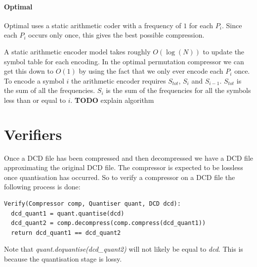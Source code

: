 \documentclass{report}
\newcommand{\todo}{\textbf{TODO} }
\begin{document}
\paragraph{Optimal}
Optimal uses a static arithmetic coder with a frequency of $1$ for each
$P_i$. Since each $P_i$ occurs only once, this gives the best possible
compression.

A static arithmetic encoder model takes roughly $O(\log(N))$ to update the
symbol table for each encoding. In the optimal permutation compressor we can
get this down to $O(1)$ by using the fact that we only ever encode each $P_i$
once. To encode a symbol $i$ the arithmetic encoder requires $S_{tot}$, $S_i$
and $S_{i-1}$. $S_{tot}$ is the sum of all the frequencies. $S_i$ is the sum
of the frequencies for all the symbols less than or equal to $i$. \todo
explain algorithm

\section{Verifiers}

Once a DCD file has been compressed and then decompressed we have a DCD file
approximating the original DCD file. The compressor is expected to be lossless
once quantisation has occurred. So to verify a compressor on a DCD file the
following process is done:

\begin{verbatim}
Verify(Compressor comp, Quantiser quant, DCD dcd):
  dcd_quant1 = quant.quantise(dcd)
  dcd_quant2 = comp.decompress(comp.compress(dcd_quant1))
  return dcd_quant1 == dcd_quant2
\end{verbatim}

Note that \emph{quant.dequantise(dcd\_quant2)} will not likely be equal to
\emph{dcd}. This is because the quantisation stage is lossy.

\nocite{*}

\end{document}
